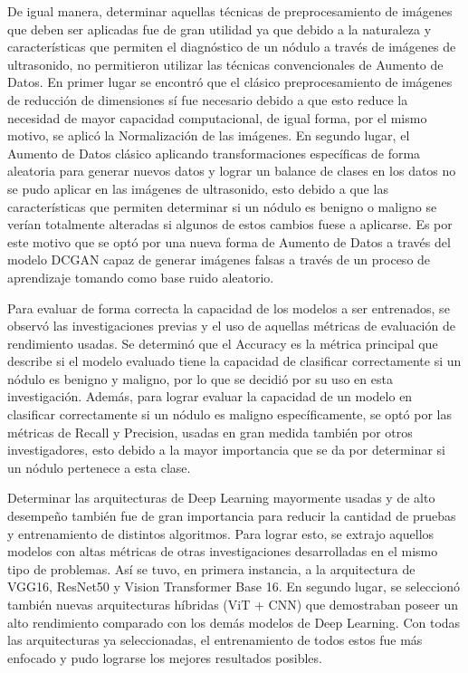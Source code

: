 De igual manera, determinar aquellas técnicas de preprocesamiento de imágenes que deben ser aplicadas fue de gran utilidad ya que debido a la naturaleza y características que permiten el diagnóstico de un nódulo a través de imágenes de ultrasonido, no permitieron utilizar las técnicas convencionales de Aumento de Datos. En primer lugar se encontró que el clásico preprocesamiento de imágenes de reducción de dimensiones sí fue necesario debido a que esto reduce la necesidad de mayor capacidad computacional, de igual forma, por el mismo motivo, se aplicó la Normalización de las imágenes. En segundo lugar, el Aumento de Datos clásico aplicando transformaciones específicas de forma aleatoria para generar nuevos datos y lograr un balance de clases en los datos no se pudo aplicar en las imágenes de ultrasonido, esto debido a que las características que permiten determinar si un nódulo es benigno o maligno se verían totalmente alteradas si algunos de estos cambios fuese a aplicarse. Es por este motivo que se optó por una nueva forma de Aumento de Datos a través del modelo DCGAN capaz de generar imágenes falsas a través de un proceso de aprendizaje tomando como base ruido aleatorio.

Para evaluar de forma correcta la capacidad de los modelos a ser entrenados, se observó las investigaciones previas y el uso de aquellas métricas de evaluación de rendimiento usadas. Se determinó que el Accuracy es la métrica principal que describe si el modelo evaluado tiene la capacidad de clasificar correctamente si un nódulo es benigno y maligno, por lo que se decidió por su uso en esta investigación. Además, para lograr evaluar la capacidad de un modelo en clasificar correctamente si un nódulo es maligno específicamente, se optó por las métricas de Recall y Precision, usadas en gran medida también por otros investigadores, esto debido a la mayor importancia que se da por determinar si un nódulo pertenece a esta clase.

Determinar las arquitecturas de Deep Learning mayormente usadas y de alto desempeño también fue de gran importancia para reducir la cantidad de pruebas y entrenamiento de distintos algoritmos. Para lograr esto, se extrajo aquellos modelos con altas métricas de otras investigaciones desarrolladas en el mismo tipo de problemas. Así se tuvo, en primera instancia, a la arquitectura de VGG16, ResNet50 y Vision Transformer Base 16. En segundo lugar, se seleccionó también nuevas arquitecturas híbridas (ViT + CNN) que demostraban poseer un alto rendimiento comparado con los demás modelos de Deep Learning. Con todas las arquitecturas ya seleccionadas, el entrenamiento de todos estos fue más enfocado y pudo lograrse los mejores resultados posibles.

